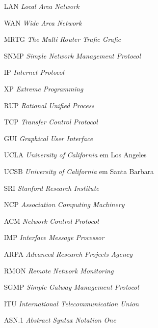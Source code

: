 
\begin{SingleSpace}

\begin{siglas}
\item[LAN] \textit{Local Area Network}
\item[WAN] \textit{Wide Area Network}
\item[MRTG] \textit{The Multi Router Trafic Grafic}
\item[SNMP] \textit{Simple Network Management Protocol}
\item[IP] \textit{Internet Protocol}
\item[XP] \textit{Extreme Programming}
\item[RUP] \textit{Rational Unified Process}
\item[TCP] \textit{Transfer Control Protocol}
\item[GUI] \textit{Graphical User Interface}
\item[UCLA] \textit{University of California} em Los Angeles 
\item[UCSB] \textit{University of California} em Santa Barbara
\item[SRI] \textit{Stanford Research Institute}
\item[NCP] \textit{Association Computing Machinery}
\item[ACM] \textit{Network Control Protocol}
\item[IMP] \textit{Interface Message Processor}
\item[ARPA] \textit{Advanced Research Projects Agency}
\item[RMON] \textit{Remote Network Monitoring}
\item[SGMP] \textit{Simple Gatway Management Protocol}
\item[ITU]  \textit{International Telecommunication Union} 
\item[ASN.1] \textit{Abstract Syntax Notation One}
\end{siglas}

\end{SingleSpace}
